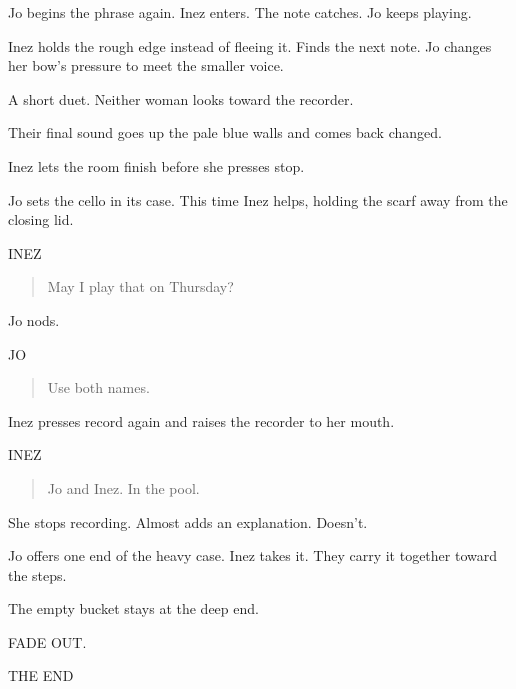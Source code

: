 \documentclass[12pt,letterpaper]{article}
\newcommand{\character}[1]{\needspace{4\baselineskip}\hspace*{2.2in}#1\par\nopagebreak}
\begin{document}
Jo begins the phrase again. Inez enters. The note catches. Jo keeps playing.\par

Inez holds the rough edge instead of fleeing it. Finds the next note. Jo changes her bow's pressure to meet the smaller voice.\par

A short duet. Neither woman looks toward the recorder.\par

Their final sound goes up the pale blue walls and comes back changed.\par

Inez lets the room finish before she presses stop.\par

Jo sets the cello in its case. This time Inez helps, holding the scarf away from the closing lid.\par

\character{INEZ}
\begin{quote}May I play that on Thursday?\par\end{quote}

Jo nods.\par

\character{JO}
\begin{quote}Use both names.\par\end{quote}

Inez presses record again and raises the recorder to her mouth.\par

\character{INEZ}
\begin{quote}Jo and Inez. In the pool.\par\end{quote}

She stops recording. Almost adds an explanation. Doesn't.\par

Jo offers one end of the heavy case. Inez takes it. They carry it together toward the steps.\par

The empty bucket stays at the deep end.\par

\begin{flushright}FADE OUT.\end{flushright}

\begin{flushright}THE END\end{flushright}
\end{document}
